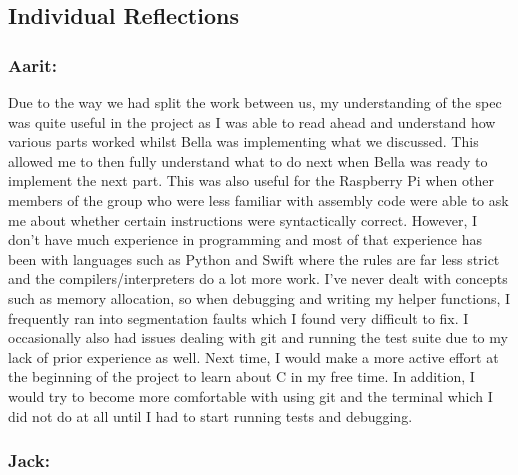 \documentclass[11pt]{article}
\begin{document}
\hypertarget{h.ttl365hle8uq}{%
\subsection{\texorpdfstring{{Individual
Reflections}}{Individual Reflections}}\label{h.ttl365hle8uq}}

\hypertarget{h.ismxnmdep3kw}{%
\subsubsection{\texorpdfstring{{Aarit:}}{Aarit:}}\label{h.ismxnmdep3kw}}

{Due to the way we had split the work between us, my understanding of
the spec was quite useful in the project as I was able to read ahead and
understand how various parts worked whilst Bella was implementing what
we discussed. This allowed me to then fully understand what to do next
when Bella was ready to implement the next part. This was also useful
for the Raspberry Pi when other members of the group who were less
familiar with assembly code were able to ask me about whether certain
instructions were syntactically correct. However, I don't have much
experience in programming and most of that experience has been with
languages such as Python and Swift where the rules are far less strict
and the compilers/interpreters do a lot more work. I've never dealt with
concepts such as memory allocation, so when debugging and writing my
helper functions, I frequently ran into segmentation faults which I
found very difficult to fix. I occasionally also had issues dealing with
git and running the test suite due to my lack of prior experience as
well. Next time, I would make a more active effort at the beginning of
the project to learn about C in my free time. In addition, I would try
to become more comfortable with using git and the terminal which I did
not do at all until I had to start running tests and debugging.}

\hypertarget{h.9tz4i4mcmyx4}{%
\subsubsection{\texorpdfstring{{Jack:}}{Jack:}}\label{h.9tz4i4mcmyx4}}
\end{document}
